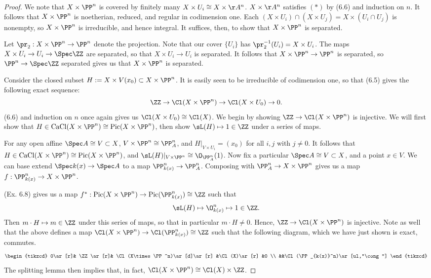 \documentclass[12pt]{amsart}
\DeclareMathOperator{\CaCl}{CaCl}
\DeclareMathOperator{\Pic}{Pic}
\begin{document}
\begin{proof}
  We note that $X\times \PP^n$ is covered by finitely many $X\times U_i\cong X\times \AA^n$.
  $X\times \AA^n$ satisfies $(*)$ by (6.6) and induction on $n$.
  It follows that $X\times \PP^n$ is noetherian, reduced, and regular in codimension one.
  Each $(X\times U_i)\cap(X\times U_j)=X\times (U_i\cap U_j)$ is nonempty, so $X\times \PP^n$ is irreducible, and hence integral.
  It suffices, then, to show that $X\times\PP^n$ is separated.

  Let $\pr_2:X\times \PP^n\to \PP^n$ denote the projection.
  Note that our cover $\{U_i\}$ has $\pr_2^{-1}(U_i)=X\times U_i$.
  The maps $X\times U_i\to U_i\to \Spec \ZZ$ are separated, so that $X\times U_i\to U_i$ is separated.
  It follows that $X\times \PP^n\to \PP^n$ is separated, so $\PP^n\to \Spec \ZZ$ separated gives us that $X\times \PP^n$ is separated.

  Consider the closed subset $H:=X\times V(x_0)\subset X\times \PP^n$.
  It is easily seen to be irreducible of codimension one, so that (6.5) gives the following exact sequence:
  \[
    \ZZ\to \Cl(X\times \PP^n)\to \Cl(X\times U_0)\to 0.
  \] 
  (6.6) and induction on $n$ once again gives us $\Cl(X\times U_0)\cong \Cl(X)$.
  We begin by showing $\ZZ\to \Cl(X\times \PP^n)$ is injective.
  We will first show that $H\in \CaCl (X\times \PP^n)\cong \Pic(X\times \PP^n)$, then show $\sL(H)\mapsto 1\in \ZZ$ under a series of maps.

  For any open affine $\Spec A\cong V\subset X$, $V\times \PP^n\cong \PP^n_A$, and $H|_{V\times U_i}= (x_0)$ for all $i,j$ with $j\neq 0$.
  It follows that $H\in \CaCl (X\times \PP^n)\cong \Pic(X\times \PP^n)$, and $\sL(H)|_{V\times \PP^n}\cong\O_{\PP^n_{A}}(1)$.
  Now fix a particular $\Spec A\cong V\subset X$, and a point $x\in V$.
  We can base extend $\Spec k(x)\to \Spec A$ to a map $\PP^n_{k(x)}\to \PP^n_A$.
  Composing with $\PP^n_A\to X\times \PP^n$ gives us a map $f:\PP^n_{k(x)}\to X\times \PP^n$.

  (Ex. 6.8) gives us a map $f^*:\Pic(X\times \PP^n)\to \Pic(\PP^n_{k(x)})\cong \ZZ$ such that 
  \[
    \sL(H)\mapsto \O_{k(x)}^n\mapsto 1\in \ZZ.
  \]
  Then $m\cdot H\mapsto m\in \ZZ$ under this series of maps, so that in particular $m\cdot H\neq 0$.
  Hence, $\ZZ\to \Cl(X\times \PP^n)$ is injective.
  Note as well that the above defines a map $\Cl(X\times \PP^n)\to \Cl(\PP^n_{k(x)})\cong \ZZ$ such that the following diagram, which we have just shown is exact, commutes.
  \[
    \begin{tikzcd}
      0\ar[r]& \ZZ\ar[r]& \Cl(X\times \PP^n)\ar[d]\ar[r] &\Cl(X)\ar[r] &0 \\
             &&\Cl(\PP_{k(x)}^n)\ar[ul,"\cong"]
    \end{tikzcd}
  \] 
  The splitting lemma then implies that, in fact, $\Cl(X\times \PP^n)\cong \Cl(X)\times \ZZ$.
\end{proof}
\end{document}
